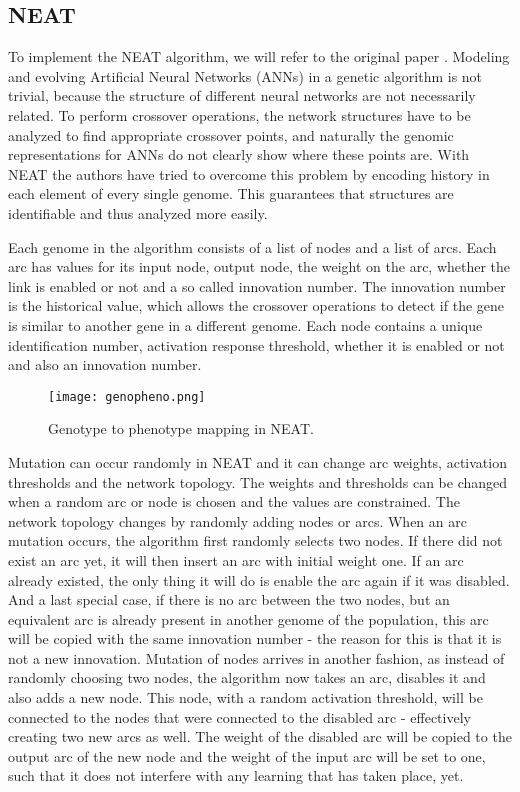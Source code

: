 \subsection{NEAT}

To implement the NEAT algorithm, we will refer to the original paper \cite{stanleyneat}.
Modeling and evolving Artificial Neural Networks (ANNs) in a genetic algorithm is not trivial, because the structure of different neural networks are not necessarily related.
To perform crossover operations, the network structures have to be analyzed to find appropriate crossover points, and naturally the genomic representations for ANNs do not clearly show where these points are.
With NEAT the authors have tried to overcome this problem by encoding history in each element of every single genome.
This guarantees that structures are identifiable and thus analyzed more easily.

Each genome in the algorithm consists of a list of nodes and a list of arcs.
Each arc has values for its input node, output node, the weight on the arc, whether the link is enabled or not and a so called innovation number.
The innovation number is the historical value, which allows the crossover operations to detect if the gene is similar to another gene in a different genome.
Each node contains a unique identification number, activation response threshold, whether it is enabled or not and also an innovation number.

\begin{figure}[H]
\centering
\texttt{[image: genopheno.png]}
\caption{Genotype to phenotype mapping in NEAT.}
\label{fig:gen}
\end{figure}

Mutation can occur randomly in NEAT and it can change arc weights, activation thresholds and the network topology.
The weights and thresholds can be changed when a random arc or node is chosen and the values are constrained.
The network topology changes by randomly adding nodes or arcs.
When an arc mutation occurs, the algorithm first randomly selects two nodes.
If there did not exist an arc yet, it will then insert an arc with initial weight one.
If an arc already existed, the only thing it will do is enable the arc again if it was disabled.
And a last special case, if there is no arc between the two nodes, but an equivalent arc is already present in another genome of the population, this arc will be copied with the same innovation number - the reason for this is that it is not a new innovation.
Mutation of nodes arrives in another fashion, as instead of randomly choosing two nodes, the algorithm now takes an arc, disables it and also adds a new node.
This node, with a random activation threshold, will be connected to the nodes that were connected to the disabled arc - effectively creating two new arcs as well.
The weight of the disabled arc will be copied to the output arc of the new node and the weight of the input arc will be set to one, such that it does not interfere with any learning that has taken place, yet.

